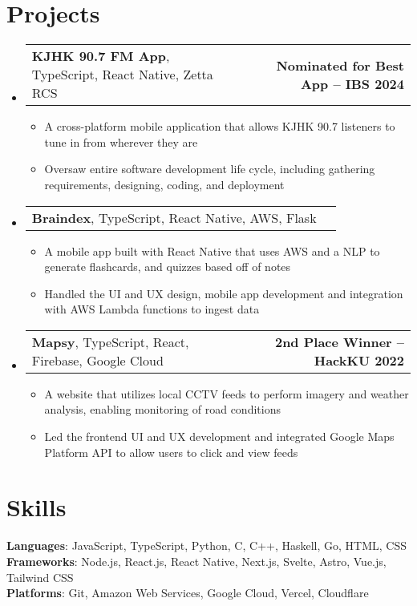 \documentclass[letter,11pt]{article}
\makeatletter
\newcommand{\resumeItem}[1]{
	\item \small{{#1 \vspace{-2pt}}}
}
\newcommand{\resumeProjectHeading}[2]{
    \item
    \begin{tabular*}{1.001\textwidth}{l@{\extracolsep{\fill}}r}
		\small#1 & \textbf{\small #2}\\
    \end{tabular*}\vspace{-5pt}
}
\newcommand{\resumeSubHeadingListStart}{\begin{itemize}[leftmargin=0.0in, label={}]}
\newcommand{\resumeSubHeadingListEnd}{\end{itemize}}
\newcommand{\resumeItemListStart}{\begin{itemize}[leftmargin=0.5cm]}
\newcommand{\resumeItemListEnd}{\end{itemize}\vspace{-5pt}}
\makeatother
\begin{document}
\section{Projects}
    \vspace{-5pt}
	\resumeSubHeadingListStart
		\resumeProjectHeading{\textbf{KJHK 90.7 FM App}, {TypeScript, React Native, Zetta RCS}}{Nominated for Best App -- IBS 2024}
			\resumeItemListStart
				\resumeItem{A cross-platform mobile application that allows KJHK 90.7 listeners to tune in from wherever they are}
				\resumeItem{Oversaw entire software development life cycle, including gathering requirements, designing, coding, and deployment}
			\resumeItemListEnd
			\vspace{-15pt}
		\resumeProjectHeading{\textbf{Braindex}, {TypeScript, React Native, AWS, Flask}}{}
			\resumeItemListStart
				\resumeItem{A mobile app built with React Native that uses AWS and a NLP to generate flashcards, and quizzes based off of notes}
				\resumeItem{Handled the UI and UX design, mobile app development and integration with AWS Lambda functions to ingest data}
			\resumeItemListEnd
			\vspace{-15pt}
		\resumeProjectHeading{\textbf{Mapsy}, {TypeScript, React, Firebase, Google Cloud}}{2nd Place Winner -- HackKU 2022}
			\resumeItemListStart
				\resumeItem{A website that utilizes local CCTV feeds to perform imagery and weather analysis, enabling monitoring of road conditions}
				\resumeItem{Led the frontend UI and UX development and integrated Google Maps Platform API to allow users to click and view feeds}
			\resumeItemListEnd
	\resumeSubHeadingListEnd
\vspace{-15pt}

\section{Skills}
	\begin{itemize}[leftmargin=0.05in, label={}]
		\small{\item{
			\textbf{Languages}{: JavaScript, TypeScript, Python, C, C++, Haskell, Go, HTML, CSS} \\
			\textbf{Frameworks}{: Node.js, React.js, React Native, Next.js, Svelte, Astro, Vue.js, Tailwind CSS} \\
			\textbf{Platforms}{: Git, Amazon Web Services, Google Cloud, Vercel, Cloudflare}
		}}
	\end{itemize}
\vspace{-15pt}
\end{document}
